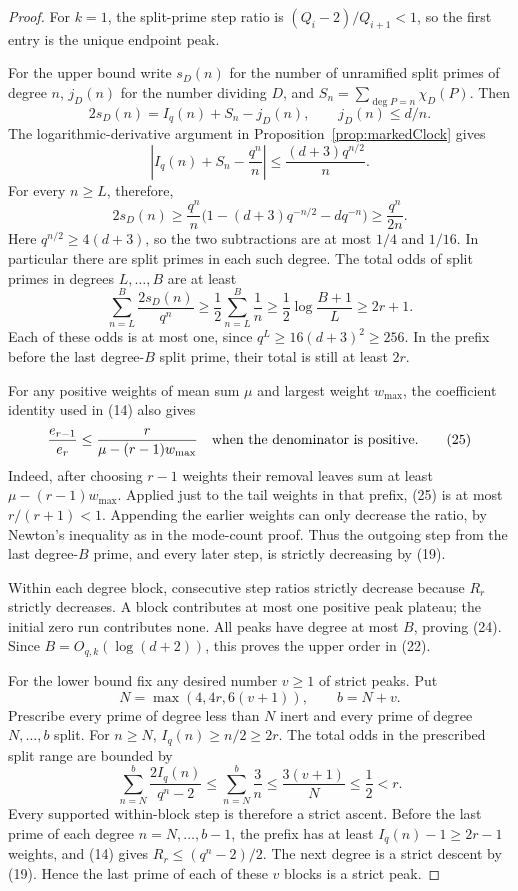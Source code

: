 \documentclass[11pt]{article}
\begin{document}
\begin{proof}
For \(k=1\), the split-prime step ratio is
\((Q_i-2)/Q_{i+1}<1\), so the first entry is the unique endpoint peak.

For the upper bound write \(s_D(n)\) for the number of unramified
split primes of degree \(n\), \(j_D(n)\) for the number dividing \(D\),
and \(S_n=\sum_{\deg P=n}\chi_D(P)\). Then
\[
 2s_D(n)=I_q(n)+S_n-j_D(n),\qquad j_D(n)\leq d/n.
\]
The logarithmic-derivative argument in
Proposition~\ref{prop:markedClock} gives
\[
 \left|I_q(n)+S_n-\frac{q^n}{n}\right|
       \leq\frac{(d+3)q^{n/2}}n .
\]
For every \(n\geq L\), therefore,
\[
 2s_D(n)\geq\frac{q^n}{n}
       \bigl(1-(d+3)q^{-n/2}-d q^{-n}\bigr)
       \geq\frac{q^n}{2n}.
\]
Here \(q^{n/2}\geq4(d+3)\), so the two subtractions are at most
\(1/4\) and \(1/16\). In particular there are split primes in each
such degree. The total odds of split primes in degrees \(L,\ldots,B\)
are at least
\[
 \sum_{n=L}^B\frac{2s_D(n)}{q^n}
 \geq\frac12\sum_{n=L}^B\frac1n
 \geq\frac12\log\frac{B+1}{L}\geq2r+1.
\]
Each of these odds is at most one, since
\(q^L\geq16(d+3)^2\geq256\).
In the prefix before the last degree-\(B\) split prime, their total
is still at least \(2r\).

For any positive weights of mean sum \(\mu\) and largest weight
\(w_{\max}\), the coefficient identity used in (14) also gives
\[
 \frac{e_{r-1}}{e_r}
       \leq\frac{r}{\mu-(r-1)w_{\max}}
 \quad\hbox{when the denominator is positive}.             \tag{25}
\]
Indeed, after choosing \(r-1\) weights their removal leaves sum
at least \(\mu-(r-1)w_{\max}\).
Applied just to the tail weights in that prefix, (25) is at most
\(r/(r+1)<1\). Appending the earlier weights can only decrease
the ratio, by Newton's inequality as in the mode-count proof.
Thus the outgoing step from the last degree-\(B\) prime, and every
later step, is strictly decreasing by (19).

Within each degree block, consecutive step ratios strictly decrease
because \(R_r\) strictly decreases. A block contributes at most one
positive peak plateau; the initial zero run contributes none.
All peaks have degree at most \(B\), proving (24).
Since \(B=O_{q,k}(\log(d+2))\), this proves the upper order in (22).

For the lower bound fix any desired number \(v\geq1\) of strict peaks.
Put
\[
 N=\max(4,4r,6(v+1)),\qquad b=N+v.
\]
Prescribe every prime of degree less than \(N\) inert and every
prime of degree \(N,\ldots,b\) split.
For \(n\geq N\), \(I_q(n)\geq n/2\geq2r\).
The total odds in the prescribed split range are bounded by
\[
 \sum_{n=N}^{b}\frac{2I_q(n)}{q^n-2}
       \leq\sum_{n=N}^{b}\frac3n
       \leq\frac{3(v+1)}N\leq\frac12<r.
\]
Every supported within-block step is therefore a strict ascent.
Before the last prime of each degree \(n=N,\ldots,b-1\), the
prefix has at least \(I_q(n)-1\geq2r-1\) weights, and (14) gives
\(R_r\leq(q^n-2)/2\). The next degree is a strict descent by (19).
Hence the last prime of each of these \(v\) blocks is a strict peak.


\end{proof}
\end{document}

